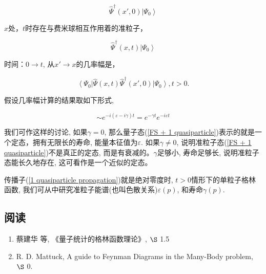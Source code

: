 \begin{equation}\label{FS + 1 quasiparticle}
\hat \Psi^\dagger (x', 0) \left| \Psi_0 \right\rangle
\end{equation}

$x$处，$t$时存在与费米球相互作用着的准粒子，

\begin{equation*}
\hat \Psi^\dagger (x, t) \left| \Psi_0 \right\rangle
\end{equation*}

时间：$0 \to t$, 从$x' \to x$的几率幅是，

\begin{equation}\label{1 quasiparticle propagation}
\left\langle \Psi_0 \right| \hat \Psi(x, t) \hat \Psi^\dagger(x',
0)\left| \Psi_0 \right\rangle, t>0.
\end{equation}

假设几率幅计算的结果取如下形式,

\begin{equation*}
\sim e^{-i (\varepsilon - i \gamma )t} = e^{-\gamma t} e^{-i
\varepsilon t}
\end{equation*}

我们可作这样的讨论, 如果$\gamma = 0$, 那么量子态(\ref{FS + 1 quasiparticle})表示的就是一个定态，拥有无限长的寿命,
能量本征值为$\varepsilon$. 如果$\gamma \neq 0$, 说明准粒子态(\ref{FS + 1 quasiparticle})不是真正的定态, 而是有衰减的。$\gamma$足够小, 寿命足够长, 说明准粒子态能长久地存在, 这可看作是一个近似的定态。

传播子(\ref{1 quasiparticle propagation})就是绝对零度时,
$t>0$情形下的单粒子格林函数, 我们可从中研究准粒子能谱(也叫色散关系)$\varepsilon (p)$, 和寿命$\gamma (p)$.

\subsection*{阅读}

\begin{enumerate}

  \item 蔡建华 等, 《量子统计的格林函数理论》, $\S$ 1.5

  \item R. D. Mattuck, A guide to Feynman Diagrams in the Many-Body problem, $\S$ 0.

\end{enumerate}